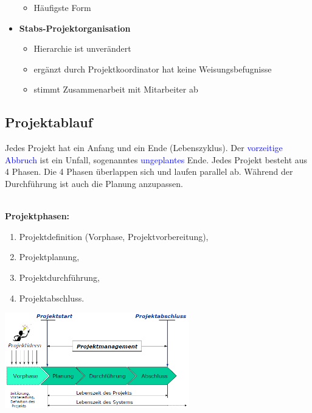 \begin{multicols}{3}
\begin{itemize}
\begin{itemize}
			\item Häufigste Form
		\end{itemize}
		\item \textbf{Stabs-Projektorganisation}
		\begin{itemize}
			\item Hierarchie ist unverändert
			\item ergänzt durch Projektkoordinator hat keine \newline Weisungsbefugnisse
			\item stimmt Zusammenarbeit mit Mitarbeiter ab
		\end{itemize}
	\end{itemize}
\end{multicols}

\subsection{Projektablauf}
Jedes Projekt hat ein Anfang und ein Ende (Lebenszyklus). Der \textcolor{blue}{vorzeitige Abbruch} ist ein Unfall, sogenanntes \newline \textcolor{blue}{ungeplantes} Ende. Jedes Projekt besteht aus 4 Phasen. Die 4 Phasen überlappen sich und laufen parallel ab. \newline Während der Durchführung ist auch die Planung anzupassen. \\
\\
\begin{minipage}{6cm}
	\textbf{Projektphasen:}
	\begin{enumerate}
		\item Projektdefinition (Vorphase, Projektvorbereitung),
		\item Projektplanung,
		\item Projektdurchführung,
		\item Projektabschluss.
	\end{enumerate}
\end{minipage}
\begin{minipage}{7cm}
	\includegraphics[width=8cm]{images/projektablauf.png}
\end{minipage}

